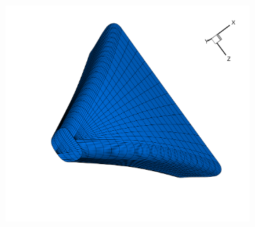 \documentclass[8pt, aspectratio=169]{beamer}
\begin{document}
\begin{frame}
\begin{figure}[H]
\begin{subfigure}{.3\textwidth}
		\end{subfigure}
		\begin{subfigure}{.3\textwidth}
			\includegraphics[width=\textwidth]{../../tec/slots/18.png}
		\end{subfigure}
	\end{figure}
	\vfill
\end{frame}
\end{document}
